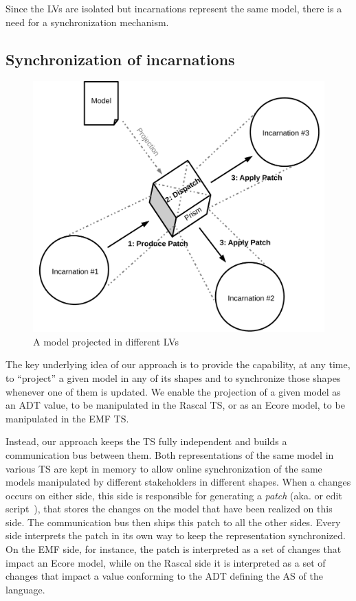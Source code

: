 Since the LVs are isolated but incarnations represent the same model, there is a need for a synchronization mechanism.



\subsection{Synchronization of incarnations}

\begin{figure}
	\centering
	\includegraphics[width=.6\columnwidth]{figures/prism}
	\caption{A model projected in different LVs}
	\label{fig:prism}
\end{figure}

The key underlying idea of our approach is to provide the capability, at any time, to ``project'' a given model in any of its shapes and to synchronize those shapes whenever one of them is updated.
We enable the projection of a given model as an ADT value, to be manipulated in the Rascal TS, or as an Ecore model, to be manipulated in the EMF TS.

Instead, our approach keeps the TS fully independent and builds a communication bus between them.
Both representations of the same model in various TS are kept in memory to allow online synchronization of the same models manipulated by different stakeholders in different shapes.
When a changes occurs on either side, this side is responsible for generating a \emph{patch} (aka. \de or edit script~\cite{rozen2017towards}), that stores the changes on the model that have been realized on this side.
The communication bus then ships this patch to all the other sides.
Every side interprets the patch in its own way to keep the representation synchronized.
On the EMF side, for instance, the patch is interpreted as a set of changes that impact an Ecore model, while on the Rascal side it is interpreted as a set of changes that impact a value conforming to the ADT defining the AS of the language.

